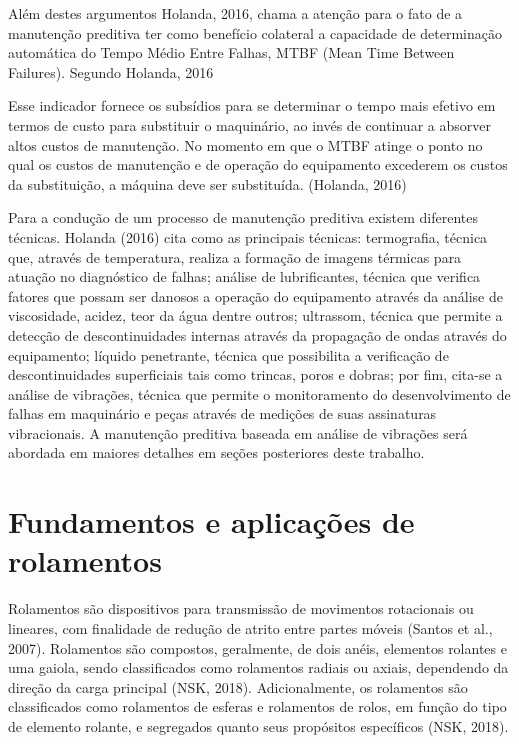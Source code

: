 \documentclass[
	12pt,				
	oneside,			
	a4paper,			
	english,			
	brazil				
	]{abntex2ppgsi}
\begin{document}
Além destes argumentos Holanda, 2016, chama a atenção para o fato de a manutenção preditiva ter como benefício colateral a capacidade de determinação automática do Tempo Médio Entre Falhas, MTBF (Mean Time Between Failures). Segundo Holanda, 2016

\begin{citacao}
Esse indicador fornece os subsídios para se determinar o tempo mais efetivo em termos de custo para substituir o maquinário, ao invés de continuar a absorver altos custos de manutenção. No momento em que o MTBF atinge o ponto no qual os custos de manutenção e de operação do equipamento excederem os custos da substituição, a máquina deve ser substituída. (Holanda, 2016)
\end{citacao}

Para a condução de um processo de manutenção preditiva existem diferentes técnicas. Holanda (2016) cita como as principais técnicas: termografia, técnica que, através de temperatura, realiza a formação de imagens térmicas para atuação no diagnóstico de falhas; análise de lubrificantes, técnica que verifica fatores que possam ser danosos a operação do equipamento através da análise de viscosidade, acidez, teor da água dentre outros; ultrassom, técnica que permite a detecção de descontinuidades internas através da propagação de ondas através do equipamento; líquido penetrante, técnica que possibilita a verificação de descontinuidades superficiais tais como trincas, poros e dobras; por fim, cita-se a análise de vibrações, técnica que permite o monitoramento do desenvolvimento de falhas em maquinário e peças através de medições de suas assinaturas vibracionais. A manutenção preditiva baseada em análise de vibrações será abordada em maiores detalhes em seções posteriores deste trabalho.


\section{\textbf{Fundamentos e aplicações de rolamentos}}
Rolamentos são dispositivos para transmissão de movimentos rotacionais ou lineares, com finalidade de redução de atrito entre partes móveis (Santos et al., 2007). Rolamentos são compostos, geralmente, de dois anéis, elementos rolantes e uma gaiola, sendo classificados como rolamentos radiais ou axiais, dependendo da direção da carga principal (NSK, 2018). Adicionalmente, os rolamentos são classificados como rolamentos de esferas e rolamentos de rolos, em função do tipo de elemento rolante, e segregados quanto seus propósitos específicos (NSK, 2018).
\end{document}
